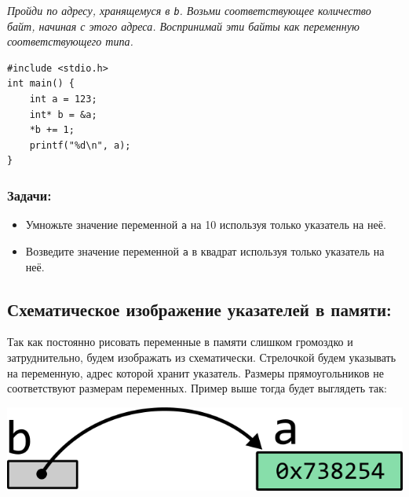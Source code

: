 \documentclass{article}
\begin{document}
\textit{Пройди по адресу, хранящемуся в \texttt{b}. Возьми соответствующее количество байт, начиная с этого адреса. Воспринимай эти байты как переменную соответствующего типа.}

\begin{lstlisting}
#include <stdio.h>
int main() {
    int a = 123;
    int* b = &a;
    *b += 1;
    printf("%d\n", a);
}
\end{lstlisting}

\subsubsection*{Задачи:}
\begin{itemize}
\item Умножьте значение переменной \texttt{a} на 10 используя только указатель на неё.
\item Возведите значение переменной \texttt{a} в квадрат используя только указатель на неё.
\end{itemize}

\subsection*{Схематическое изображение указателей в памяти:}
Так как постоянно рисовать переменные в памяти слишком громоздко и затруднительно, будем изображать из схематически. Стрелочкой будем указывать на переменную, адрес которой хранит указатель. Размеры прямоугольников не соответствуют размерам переменных. Пример выше тогда будет выглядеть так:
\begin{center}
\includegraphics[scale=1]{../images/memory/memory_3_pointer_to_int_b_scheme.png}
\end{center}
\end{document}
